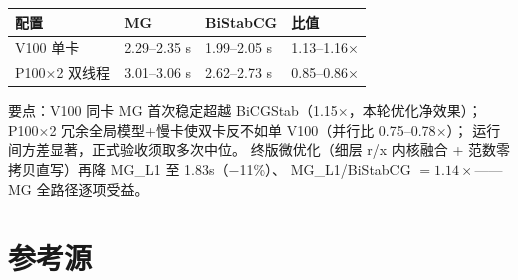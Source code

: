 \documentclass[UTF8]{ctexart}
\begin{document}
\begin{table}[htbp]\centering
\begin{tabular}{@{}llll@{}}
\toprule
配置 & MG & BiStabCG & 比值 \\
\midrule
V100 单卡 & 2.29--2.35 s & 1.99--2.05 s & \textcolor{evidence}{1.13--1.16$\times$} \\
P100$\times$2 双线程 & 3.01--3.06 s & 2.62--2.73 s & 0.85--0.86$\times$ \\
\bottomrule
\end{tabular}
\end{table}

要点：V100 同卡 MG 首次稳定超越 BiCGStab（1.15$\times$，本轮优化净效果）；
P100$\times$2 冗余全局模型+慢卡使双卡反不如单 V100（并行比 0.75--0.78$\times$）；
运行间方差显著，正式验收须取多次中位。
终版微优化（细层 r/x 内核融合 + 范数零拷贝直写）再降 MG\_L1 至 1.83s（$-$11\%）、
MG\_L1/BiStabCG $=1.14\times$——MG 全路径逐项受益。

\section{参考源}

\end{document}
